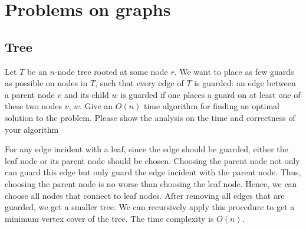 \chapter{Problems on graphs}

\section{Tree}
\begin{Exercise}[title={Vertex cover on trees}, origin={NTUT CSIE 101}]
Let $T$ be an $n$-node tree rooted at some node $r$. We want to place as few guards as possible on nodes in $T$, such that every edge of $T$ is guarded: an edge between a parent node $v$ and its child $w$ is guarded if one places a guard on at least one of these two nodes $v$, $w$. Give an $O(n)$ time algorithm for finding an optimal solution to the problem. Please show the analysis on the time and correctness of your algorithm
\end{Exercise}
\begin{Answer}
For any edge incident with a leaf, since the edge should be guarded, either the leaf node or its parent node should be chosen. Choosing the parent node not only can guard this edge but only guard the edge incident with the parent node. Thus, choosing the parent node is no worse than choosing the leaf node. Hence, we can choose all nodes that connect to leaf nodes. After removing all edges that are guarded, we get a smaller tree. We can recursively apply this procedure to get a minimum vertex cover of the tree. The time complexity is $O(n)$.
\end{Answer}


